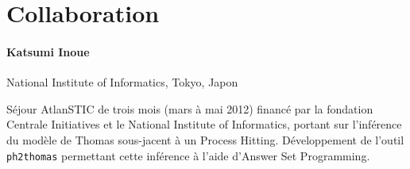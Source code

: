 \section{Collaboration}

\paragraph{Katsumi Inoue} National Institute of Informatics, Tokyo, Japon

Séjour AtlanSTIC de trois mois (mars à mai 2012) financé par la fondation Centrale Initiatives et le National Institute of Informatics,
portant sur l'inférence du modèle de Thomas sous-jacent à un Process Hitting.
Développement de l'outil \texttt{ph2thomas} permettant cette inférence à l'aide d'Answer Set Programming.
